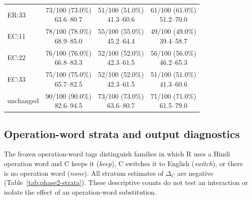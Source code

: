 \begin{table}[H]
\begin{tabular}{@{}lccc@{}}
ER:33 & \makecell{73/100 (73.0\%)\\63.6--80.7} & \makecell{51/100 (51.0\%)\\41.3--60.6} & \makecell{61/100 (61.0\%)\\51.2--70.0}\\
EC:11 & \makecell{78/100 (78.0\%)\\68.9--85.0} & \makecell{55/100 (55.0\%)\\45.2--64.4} & \makecell{49/100 (49.0\%)\\39.4--58.7}\\
EC:22 & \makecell{76/100 (76.0\%)\\66.8--83.3} & \makecell{52/100 (52.0\%)\\42.3--61.5} & \makecell{56/100 (56.0\%)\\46.2--65.3}\\
EC:33 & \makecell{75/100 (75.0\%)\\65.7--82.5} & \makecell{52/100 (52.0\%)\\42.3--61.5} & \makecell{51/100 (51.0\%)\\41.3--60.6}\\
unchanged & \makecell{90/100 (90.0\%)\\82.6--94.5} & \makecell{73/100 (73.0\%)\\63.6--80.7} & \makecell{71/100 (71.0\%)\\61.5--79.0}\\
\bottomrule
\end{tabular}
\end{table}


\subsection{Operation-word strata and output diagnostics}
The frozen operation-word tags distinguish families in which R uses a Hindi operation word and C keeps it (\emph{keep}), C switches it to English (\emph{switch}), or there is no operation word (\emph{none}). All stratum estimates of $\Delta_C$ are negative (Table~\ref{tab:phase2-strata}). These descriptive counts do not test an interaction or isolate the effect of an operation-word substitution.

